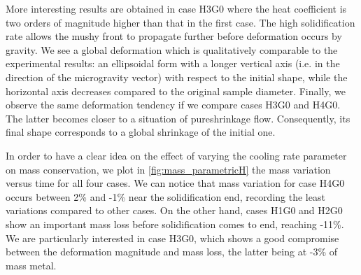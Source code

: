 More interesting results are obtained in case H3G0 where the heat coefficient is two orders of magnitude 
higher than that in the first case. The high solidification rate allows the mushy front 
to propagate further before deformation occurs by gravity. We see a global deformation which is qualitatively comparable to the experimental 
results: an ellipsoidal form with a longer vertical axis (i.e. in the direction of the microgravity vector) 
with respect to the initial shape, while the horizontal axis decreases compared to the original
sample diameter. Finally, we observe the same deformation tendency if we compare cases H3G0 and H4G0. 
The latter becomes closer to a situation of pureshrinkage flow. Consequently, its final shape corresponds to a global shrinkage of the initial one.

In order to have a clear idea on the effect of varying the cooling rate parameter on mass conservation, we plot in \cref{fig:mass_parametricH}
the mass variation versus time for all four cases. We can notice that mass variation for case H4G0 occurs between 2\% and -1\% near the solidification end,
recording the least variations compared to other cases. On the other hand, cases H1G0 and H2G0 show an important mass loss before solidification comes to end,
reaching -11\%. We are particularly interested in case H3G0, which shows a good compromise between the deformation magnitude and mass loss, the latter being at -3\% of mass metal.

